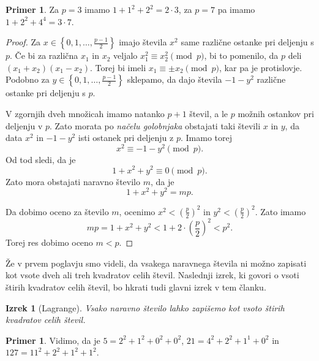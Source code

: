 \documentclass[a4paper]{amsart}
\theoremstyle{definition}
\newtheorem{primer}[definicija]{Primer}
\theoremstyle{plain}
\newtheorem{izrek}[definicija]{Izrek}
\numberwithin{equation}{section}
\begin{document}
\begin{primer}
	Za $p=3$ imamo $1+1^2+2^2=2\cdot 3$, za $p=7$ pa imamo $1+2^2+4^4=3\cdot 7$.
\end{primer}

\begin{proof}
	Za $x \in \left\{0,1,\ldots,\frac{p-1}{2}\right\}$ imajo števila $x^2$ same različne ostanke pri deljenju s $p$. Če bi za različna $x_1$ in $x_2$ veljalo $x_1^2 \equiv x_2^2\pmod{p}$, bi to pomenilo, da $p$ deli $(x_1+x_2)(x_1-x_2)$. Torej bi imeli $x_1 \equiv \pm x_2 \pmod{p}$, kar pa je protislovje. Podobno za $y \in \left\{0,1,\ldots,\frac{p-1}{2}\right\}$ sklepamo, da dajo števila $-1-y^2$ različne ostanke pri deljenju s $p$.

	V zgornjih dveh množicah imamo natanko $p+1$ števil, a le $p$ možnih ostankov pri deljenju v $p$. Zato morata po \emph{načelu golobnjaka} obstajati taki števili $x$ in $y$, da data $x^2$ in $-1-y^2$ isti ostanek pri deljenju z $p$. Imamo torej $$x^2 \equiv -1-y^2 \pmod{p}.$$ Od tod sledi, da je $$1+x^2+y^2 \equiv 0\pmod{p}.$$ Zato mora obstajati naravno število $m$, da je $$1+x^2+y^2=mp.$$

	Da dobimo oceno za število $m$, ocenimo $x^2<\left(\frac{p}{2}\right)^2$ in $y^2<\left(\frac{p}{2}\right)^2$. Zato imamo $$mp=1+x^2+y^2 <1+ 2\cdot \left(\frac{p}{2}\right)^2 < p^2.$$ Torej res dobimo oceno $m<p$.
\end{proof}

Že v prvem poglavju smo videli, da vsakega naravnega števila ni možno zapisati kot vsote dveh ali treh kvadratov celih števil. Naslednji izrek, ki govori o vsoti štirih kvadratov celih števil, bo hkrati tudi glavni izrek v tem članku.

\begin{izrek}[Lagrange]
	Vsako naravno število lahko zapišemo kot vsoto štirih kvadratov celih  števil.
\end{izrek}

\begin{primer}
	Vidimo, da je $5=2^2+1^2+0^2+0^2$, $21 = 4^2+2^2+1^1+0^2$ in $127=11^2+2^2+1^2+1^2$.
\end{primer}
\end{document}

